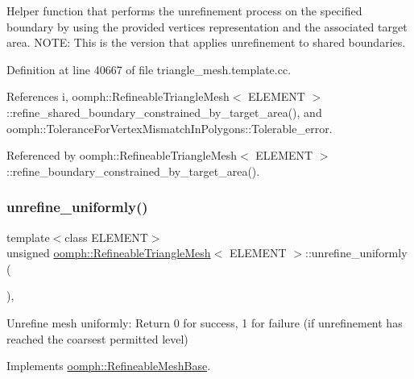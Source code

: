 Helper function that performs the unrefinement process on the specified boundary by using the provided vertices representation and the associated target area. N\+O\+TE\+: This is the version that applies unrefinement to shared boundaries. 



Definition at line 40667 of file triangle\+\_\+mesh.\+template.\+cc.



References i, oomph\+::\+Refineable\+Triangle\+Mesh$<$ E\+L\+E\+M\+E\+N\+T $>$\+::refine\+\_\+shared\+\_\+boundary\+\_\+constrained\+\_\+by\+\_\+target\+\_\+area(), and oomph\+::\+Tolerance\+For\+Vertex\+Mismatch\+In\+Polygons\+::\+Tolerable\+\_\+error.



Referenced by oomph\+::\+Refineable\+Triangle\+Mesh$<$ E\+L\+E\+M\+E\+N\+T $>$\+::refine\+\_\+boundary\+\_\+constrained\+\_\+by\+\_\+target\+\_\+area().

\mbox{\label{classoomph_1_1RefineableTriangleMesh_ae52c6aea299625c683522f00a89ff33d}} 
\subsubsection{\texorpdfstring{unrefine\+\_\+uniformly()}{unrefine\_uniformly()}}
{\footnotesize\ttfamily template$<$class E\+L\+E\+M\+E\+NT$>$ \\
unsigned \hyperlink{classoomph_1_1RefineableTriangleMesh}{oomph\+::\+Refineable\+Triangle\+Mesh}$<$ E\+L\+E\+M\+E\+NT $>$\+::unrefine\+\_\+uniformly (\begin{DoxyParamCaption}{ }\end{DoxyParamCaption})\hspace{0.3cm}{\ttfamily [inline]}, {\ttfamily [virtual]}}



Unrefine mesh uniformly\+: Return 0 for success, 1 for failure (if unrefinement has reached the coarsest permitted level) 



Implements \hyperlink{classoomph_1_1RefineableMeshBase_a5bbd5c85e7c5c9e75c5a28155ac3f956}{oomph\+::\+Refineable\+Mesh\+Base}.



